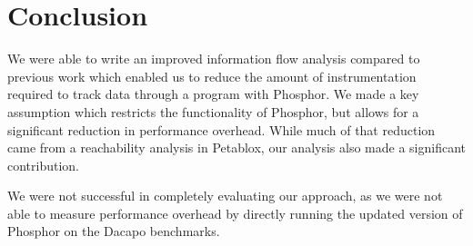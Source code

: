 \chapter{Conclusion}
We were able to write an improved information flow analysis compared to previous work which enabled us to reduce the amount of instrumentation required to track data through a program with Phosphor. We made a key assumption which restricts the functionality of Phosphor, but allows for a significant reduction in performance overhead. While much of that reduction came from a reachability analysis in Petablox, our analysis also made a significant contribution.

We were not successful in completely evaluating our approach, as we were not able to measure performance overhead by directly running the updated version of Phosphor on the Dacapo benchmarks. 
